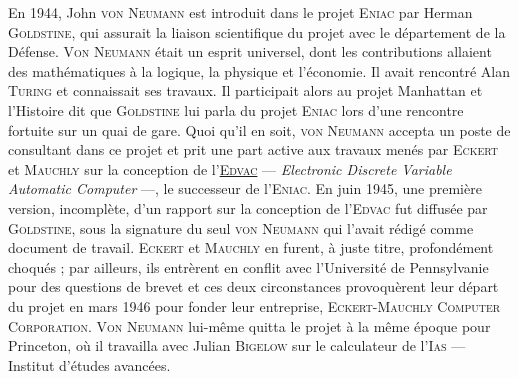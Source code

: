En 1944, John \textsc{von Neumann} est introduit dans le projet \textsc{Eniac} par Herman \textsc{Goldstine}, qui assurait la liaison scientifique du projet avec le département de la Défense. \textsc{Von Neumann} était un esprit universel, dont les contributions allaient des mathématiques à la logique, la physique et l’économie. Il avait rencontré Alan \textsc{Turing} et connaissait ses travaux. Il participait alors au projet Manhattan et l’Histoire dit que \textsc{Goldstine} lui parla du projet \textsc{Eniac} lors d’une rencontre fortuite sur un quai de gare. Quoi qu’il en soit, \textsc{von Neumann} accepta un poste de consultant dans ce projet et prit une part active aux travaux menés par \textsc{Eckert} et \textsc{Mauchly} sur la conception de l’\href{https://fr.wikipedia.org/wiki/Electronic_Discrete_Variable_Automatic_Computer}{\textsc{Edvac}} --- \textit{Electronic Discrete Variable Automatic Computer} ---, le successeur de l’\textsc{Eniac}. En juin 1945, une première version, incomplète, d’un rapport sur la conception de l’\textsc{Edvac} fut diffusée par \textsc{Goldstine}, sous la signature du seul \textsc{von Neumann} qui l’avait rédigé comme document de travail. \textsc{Eckert} et \textsc{Mauchly} en furent, à juste titre, profondément choqués ; par ailleurs, ils entrèrent en conflit avec l’Université de Pennsylvanie pour des questions de brevet et ces deux circonstances provoquèrent leur départ du projet en mars 1946 pour fonder leur entreprise, \textsc{Eckert-Mauchly Computer Corporation}. \textsc{Von Neumann} lui-même quitta le projet à la même époque pour Princeton, où il travailla avec Julian \textsc{Bigelow} sur le calculateur de l’\textsc{Ias} --- Institut d’études avancées.



